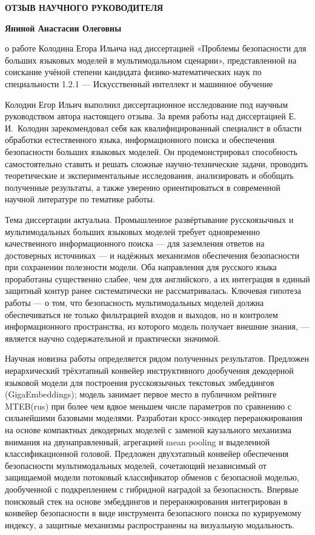 \documentclass[14pt,a4paper]{extarticle}
\begin{document}
\begin{center}
    {\bfseries ОТЗЫВ НАУЧНОГО РУКОВОДИТЕЛЯ}

    \medskip
    {\bfseries Яниной Анастасии Олеговны}

    \medskip
    о работе Колодина Егора Ильича над диссертацией
    «Проблемы безопасности для больших языковых моделей в мультимодальном сценарии»,
    представленной на соискание учёной степени кандидата физико-математических наук
    по специальности 1.2.1 --- Искусственный интеллект и машинное обучение
\end{center}

\bigskip

Колодин Егор Ильич выполнил диссертационное исследование под научным руководством автора настоящего отзыва. За время работы над диссертацией Е.\,И.~Колодин зарекомендовал себя как квалифицированный специалист в области обработки естественного языка, информационного поиска и обеспечения безопасности больших языковых моделей. Он продемонстрировал способность самостоятельно ставить и решать сложные научно-технические задачи, проводить теоретические и экспериментальные исследования, анализировать и обобщать полученные результаты, а также уверенно ориентироваться в современной научной литературе по тематике работы.

Тема диссертации актуальна. Промышленное развёртывание русскоязычных и мультимодальных больших языковых моделей требует одновременно качественного информационного поиска --- для заземления ответов на достоверных источниках --- и надёжных механизмов обеспечения безопасности при сохранении полезности модели. Оба направления для русского языка проработаны существенно слабее, чем для английского, а их интеграция в единый защитный контур ранее систематически не рассматривалась. Ключевая гипотеза работы --- о том, что безопасность мультимодальных моделей должна обеспечиваться не только фильтрацией входов и выходов, но и контролем информационного пространства, из которого модель получает внешние знания, --- является научно содержательной и практически значимой.

Научная новизна работы определяется рядом полученных результатов. Предложен иерархический трёхэтапный конвейер инструктивного дообучения декодерной языковой модели для построения русскоязычных текстовых эмбеддингов (GigaEmbeddings); модель занимает первое место в публичном рейтинге MTEB(rus) при более чем вдвое меньшем числе параметров по сравнению с сильнейшими базовыми моделями. Разработан кросс-энкодер переранжирования на основе компактных декодерных моделей с заменой каузального механизма внимания на двунаправленный, агрегацией mean pooling и выделенной классификационной головой. Предложен двухэтапный конвейер обеспечения безопасности мультимодальных моделей, сочетающий независимый от защищаемой модели потоковый классификатор обменов с безопасной моделью, дообученной с подкреплением с гибридной наградой за безопасность. Впервые поисковый стек на основе эмбеддингов и переранжирования интегрирован в конвейер безопасности в виде инструмента безопасного поиска по курируемому индексу, а защитные механизмы распространены на визуальную модальность.
\end{document}
